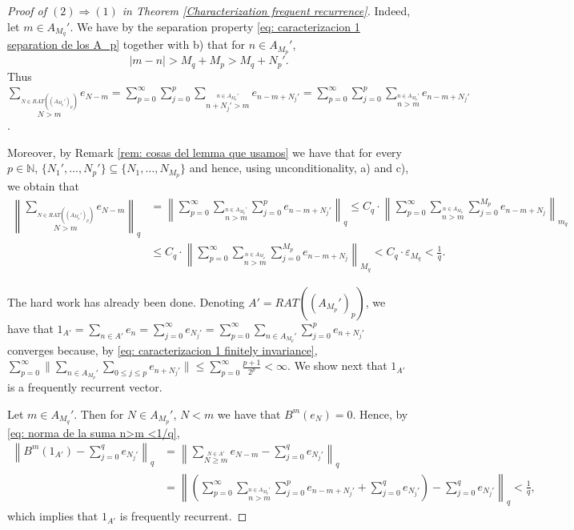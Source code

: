 \documentclass[11pt]{amsart}
\newcommand{\zN}{\mathbb N}
\begin{document}
\begin{proof}[Proof of  $(2)\Rightarrow (1)$ in Theorem \ref{Characterization frequent recurrence}]
Indeed, let $m\in A_{M_q}'$. We have by the separation property  \eqref{eq: caracterizacion 1 separation de los A_p}    together with b) that for $n\in A_{M_p}'$,
\begin{equation}\label{eq: separation Ap' first characterization}
|m-n|>M_{q}+M_p> M_{q}+N_p'.  
\end{equation}
Thus $\displaystyle \sum_{\overset{N\in RAT((A_{M_p}')_p)}{N>m}} e_{N-m} =    \sum_{p=0}^\infty\sum_{j=0}^p\sum_{\overset{n\in A_{M_{p}}'}{n+N_j'>m}} e_{n-m+N_j'}=    \sum_{p=0}^\infty\sum_{j=0}^p\sum_{\overset{n\in A_{M_{p}}'}{ n>m}} e_{n-m+N_j'}$. 

Moreover, by Remark \ref{rem: cosas del lemma que usamos} we have that for every $p\in \zN$, $\{N_1',\ldots ,N_{p}'\}\subseteq \{N_1,\ldots , N_{M_p}\}$  and hence, using unconditionality,  a) and c), we obtain that
\begin{align}
\nonumber \left\|\sum_{\overset{N\in RAT((A_{M_p}')_p)}{N>m}} e_{N-m}\right\|_q & =    \left\|\sum_{p=0}^\infty\sum_{\overset{n\in A_{M_{p}}'}{ n>m}}\sum_{j=0}^p e_{n-m+N_j'}\right\|_q \leq C_q\cdot \left\|\sum_{p=0}^\infty\sum_{\overset{n\in A_{M_p}}{n>m}}\sum_{j=0}^{M_p} e_{n-m+N_j}\right\|_{m_q}\\
 \label{eq: norma de la suma n>m <1/q}   & \leq C_q\cdot\left\|\sum_{p=0}^\infty\sum_{\overset{n\in A_{M_p}}{n>m}}\sum_{j=0}^{M_p} e_{n-m+N_j}\right\|_{M_q}
     <C_q\cdot \varepsilon_{M_{q}}%
    <\frac{1}{q}. 
\end{align}

The hard work has already been done. Denoting $A'=RAT((A_{M_p}')_p)$, we have that $1_{A'}=\sum_{n\in A'} e_n=\sum_{j=0}^\infty e_{N_j'}=\sum_{p=0}^\infty\sum_{n\in A_{M_{p}}'}\sum_{j=0}^p e_{n+N_j'} $ converges because, by \eqref{eq: caracterizacion 1 finitely invariance}, $\sum_{p=0}^\infty \|\sum_{n\in A_{M_p}'} \sum_{0\leq j\leq p} e_{n+N_j'}\|\leq \sum_{p=0}^\infty \frac{p+1}{2^p}<\infty$. We show next that $1_{A'}$ is a frequently recurrent vector.

Let $m\in A_{M_{q}}'$. Then for $N\in A_{M_p}'$, $N<m$ we have  that $ B^m(e_{N})=0$. Hence, by \eqref{eq: norma de la suma n>m <1/q},
\begin{align*}
\left\|B^{m}(1_{A'})-\sum_{j=0}^{q} e_{N_j'}
\right\|_q & = \left\|\sum_{\overset{N\in A'}{N\ge m}} e_{N-m} -\sum_{j=0}^{q} e_{N_j'}\right\|_q \\
&= \left\|\left(\sum_{p=0}^\infty\sum_{\overset{n\in A_{M_{p}}'}{n>m}}\sum_{j=0}^p e_{n-m+N_j'}+\sum_{j=0}^{q} e_{N_j'}\right)-\sum_{j=0}^{q} e_{N_j'}\right\|_q
<\frac{1}{q},    
\end{align*}
which implies that $1_{A'}$ is frequently recurrent.
\end{proof}
\end{document}
